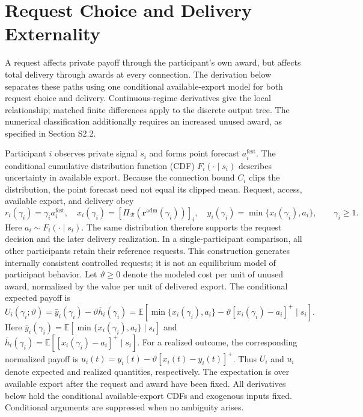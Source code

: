 \documentclass[11pt]{article}
\begin{document}
\section{Request Choice and Delivery Externality}
\label{supp:behavioral_diagnostic}

A request affects private payoff through the participant's own award, but
affects total delivery through awards at every connection. The derivation below
separates these paths using one conditional available-export model for both
request choice and delivery. Continuous-regime derivatives give the local
relationship; matched finite differences apply to the discrete output tree.
The numerical classification additionally requires an increased unused award,
as specified in Section S2.2.

Participant $i$ observes private signal $s_i$ and forms point forecast
$a_i^{\mathrm{fcst}}$. The conditional cumulative distribution function (CDF)
$F_i(\cdot\mid s_i)$ describes uncertainty in available export. Because the
connection bound $C_i$ clips the distribution, the point forecast need not equal
its clipped mean. Request, access, available export, and delivery obey
\begin{equation}
r_i(\gamma_i)=\gamma_i a_i^{\mathrm{fcst}},
\quad
x_i(\gamma_i)=[\Pi_{\mathcal R}(\mathbf r^{\mathrm{adm}}(\gamma_i))]_i,
\quad
y_i(\gamma_i)=\min\{x_i(\gamma_i),a_i\},
\qquad \gamma_i\ge1.
\label{eq:supp_behavior_chain}
\end{equation}
Here $a_i\sim F_i(\cdot\mid s_i)$. The same distribution therefore supports the
request decision and the later delivery realization. In a single-participant
comparison, all other participants retain their reference requests. This
construction generates internally consistent controlled requests; it is not an
equilibrium model of participant behavior.
Let $\vartheta\ge0$ denote the modeled cost per unit of unused award, normalized
by the value per unit of delivered export. The conditional expected payoff is
\begin{equation}
U_i(\gamma_i;\vartheta)
=\bar y_i(\gamma_i)-\vartheta\bar h_i(\gamma_i)
=\mathbb E\!\left[
\min\{x_i(\gamma_i),a_i\}
-\vartheta[x_i(\gamma_i)-a_i]^+
\mid s_i\right].
\label{eq:supp_behavioral_payoff}
\end{equation}
Here
$\bar y_i(\gamma_i)=\mathbb E[\min\{x_i(\gamma_i),a_i\}\mid s_i]$ and
$\bar h_i(\gamma_i)=\mathbb E[[x_i(\gamma_i)-a_i]^+\mid s_i]$.
For a realized outcome, the corresponding normalized payoff is
$u_i(t)=y_i(t)-\vartheta[x_i(t)-y_i(t)]^+$. Thus $U_i$ and $u_i$ denote
expected and realized quantities, respectively.
The expectation is over available export after the request and award have been
fixed. All derivatives below hold the conditional available-export CDFs and
exogenous inputs fixed. Conditional arguments are suppressed when no ambiguity
arises.
\end{document}
